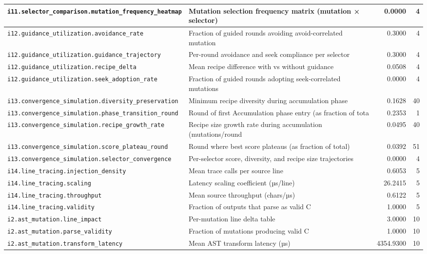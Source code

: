 \begin{table}[htbp]
\begin{tabular}{llrr}
\texttt{i11.selector\_comparison.mutation\_frequency\_heatmap} & Mutation selection frequency matrix (mutation × selector) & 0.0000 & 4 \\
\midrule
\texttt{i12.guidance\_utilization.avoidance\_rate} & Fraction of guided rounds avoiding avoid-correlated mutation & 0.3000 & 4 \\
\texttt{i12.guidance\_utilization.guidance\_trajectory} & Per-round avoidance and seek compliance per selector & 0.3000 & 4 \\
\texttt{i12.guidance\_utilization.recipe\_delta} & Mean recipe difference with vs without guidance & 0.0508 & 4 \\
\texttt{i12.guidance\_utilization.seek\_adoption\_rate} & Fraction of guided rounds adopting seek-correlated mutations & 0.0000 & 4 \\
\midrule
\texttt{i13.convergence\_simulation.diversity\_preservation} & Minimum recipe diversity during accumulation phase & 0.1628 & 40 \\
\texttt{i13.convergence\_simulation.phase\_transition\_round} & Round of first Accumulation phase entry (as fraction of tota & 0.2353 & 1 \\
\texttt{i13.convergence\_simulation.recipe\_growth\_rate} & Recipe size growth rate during accumulation (mutations/round & 0.0495 & 40 \\
\texttt{i13.convergence\_simulation.score\_plateau\_round} & Round where best score plateaus (as fraction of total) & 0.0392 & 51 \\
\texttt{i13.convergence\_simulation.selector\_convergence} & Per-selector score, diversity, and recipe size trajectories & 0.0000 & 4 \\
\midrule
\texttt{i14.line\_tracing.injection\_density} & Mean trace calls per source line & 0.6053 & 5 \\
\texttt{i14.line\_tracing.scaling} & Latency scaling coefficient (µs/line) & 26.2415 & 5 \\
\texttt{i14.line\_tracing.throughput} & Mean source throughput (chars/µs) & 0.6122 & 5 \\
\texttt{i14.line\_tracing.validity} & Fraction of outputs that parse as valid C & 1.0000 & 5 \\
\midrule
\texttt{i2.ast\_mutation.line\_impact} & Per-mutation line delta table & 3.0000 & 10 \\
\texttt{i2.ast\_mutation.parse\_validity} & Fraction of mutations producing valid C & 1.0000 & 10 \\
\texttt{i2.ast\_mutation.transform\_latency} & Mean AST transform latency (µs) & 4354.9300 & 10 \\

\end{tabular}
\end{table}
